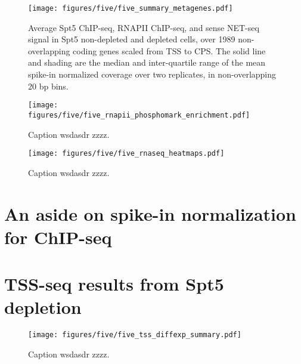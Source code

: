 \lipsum

\begin{wrapfigure}[14]{r}{3in}
    \texttt{[image: figures/five/five\_summary\_metagenes.pdf]}
    \caption[Average Spt5 ChIP-seq, RNAPII ChIP-seq, and sense NET-seq signal over non-overlapping coding genes, from Spt5 depleted and non-depleted cells.]{Average Spt5 ChIP-seq, RNAPII ChIP-seq, and sense NET-seq signal in Spt5 non-depleted and depleted cells, over 1989 non-overlapping coding genes scaled from TSS to CPS. The solid line and shading are the median and inter-quartile range of the mean spike-in normalized coverage over two replicates, in non-overlapping 20 bp bins.}
    \label{fig:five_suummary_metagenes}
\end{wrapfigure}

\lipsum[2]

\begin{wrapfigure}[6]{r}{4.5in}
    \texttt{[image: figures/five/five\_rnapii\_phosphomark\_enrichment.pdf]}
    \caption[Enrichment of RNAPII phospho-serine 5 and phospho-serine 2 over non-overlapping coding genes, in Spt5 depleted and non-depleted cells.]{Caption wsdasdr zzzz.}
    \label{fig:five_rnapii_phosphomark_enrichment}
\end{wrapfigure}

\begin{figure}
    \texttt{[image: figures/five/five\_rnaseq\_heatmaps.pdf]}
    \caption[Heatmaps of antisense RNA-seq signal from Spt5 depleted and non-depleted cells, over non-overlapping coding genes.]{Caption wsdasdr zzzz.}
    \label{fig:five_rnaseq_heatmaps}
\end{figure}

\lipsum[2]

\section{An aside on spike-in normalization for ChIP-seq}

\section{TSS-seq results from Spt5 depletion}

\begin{wrapfigure}[6]{r}{3in}
    \texttt{[image: figures/five/five\_tss\_diffexp\_summary.pdf]}
    \caption[Bar plot of the number of TSS-seq peaks of various genomic classes differentially expressed in Spt5 depleted versus non-depleted cells.]{Caption wsdasdr zzzz.}
    \label{fig:five_tss_diffexp_summary}
\end{wrapfigure}

